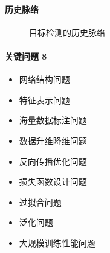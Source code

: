 \documentclass[letterpaper,10pt,english]{sphinxmanual}
\begin{document}
\paragraph{历史脉络}
\label{\detokenize{chapter_AI_dive/DL:id4}}
\begin{figure}[H]
\centering
\capstart

\noindent{}
\caption{目标检测的历史脉络\sphinxfootnotemark[946]}\label{\detokenize{chapter_AI_dive/DL:id10}}\end{figure}
%
\begin{footnotetext}[946]\sphinxAtStartFootnote
{}
%
\end{footnotetext}\ignorespaces 

\paragraph{关键问题 8\sphinxfootnotemark[947]}
\label{\detokenize{chapter_AI_dive/DL:id5}}%
\begin{footnotetext}[947]\sphinxAtStartFootnote
{}
%
\end{footnotetext}\ignorespaces \begin{itemize}
\item {} 
网络结构问题

\item {} 
特征表示问题

\item {} 
海量数据标注问题

\item {} 
数据升维降维问题

\item {} 
反向传播优化问题

\item {} 
损失函数设计问题

\item {} 
过拟合问题

\item {} 
泛化问题

\item {} 
大规模训练性能问题

\end{itemize}
\end{document}
